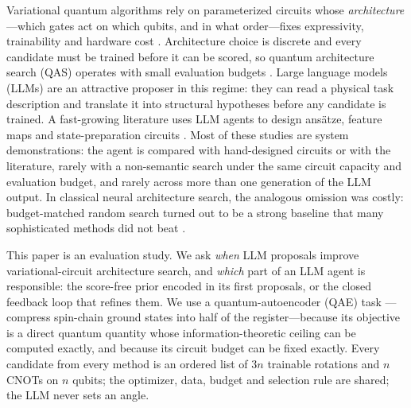 \documentclass[11pt]{article}
\begin{document}
Variational quantum algorithms rely on parameterized circuits whose
\emph{architecture}---which gates act on which qubits, and in what
order---fixes expressivity, trainability and hardware cost
\cite{bharti2022nisq,sim2019,mcclean2018barren}.
Architecture choice is discrete and every candidate must be trained before it
can be scored, so quantum architecture search (QAS) operates with small
evaluation budgets \cite{du2022,zhang2022dqas,kuo2021qasrl,ostaszewski2021structure,grimsley2019adapt}.
Large language models (LLMs) are an attractive proposer in this regime: they can
read a physical task description and translate it into structural hypotheses
before any candidate is trained.
A fast-growing literature uses LLM agents to design ans\"atze, feature maps and
state-preparation circuits
\cite{liang2023qgas,knipfer2026,sakka2025featuremap,sakka2026,cao2025funsearch,finger2026hive,gujju2025qcbm,ueda2025qgan,macarone2026testtime,bhatia2026qrc}.
Most of these studies are system demonstrations: the agent is compared with
hand-designed circuits or with the literature, rarely with a non-semantic search
under the same circuit capacity and evaluation budget, and rarely across more than
one generation of the LLM output.
In classical neural architecture search, the analogous omission was costly:
budget-matched random search turned out to be a strong baseline that many
sophisticated methods did not beat \cite{li2019randomnas,bergstra2012random}.

This paper is an evaluation study.
We ask \emph{when} LLM proposals improve variational-circuit architecture search,
and \emph{which} part of an LLM agent is responsible: the score-free prior encoded
in its first proposals, or the closed feedback loop that refines them.
We use a quantum-autoencoder (QAE) task \cite{romero2017}---compress spin-chain
ground states into half of the register---because its objective is a direct quantum
quantity whose information-theoretic ceiling can be computed exactly, and because
its circuit budget can be fixed exactly.
Every candidate from every method is an ordered list of $3n$ trainable rotations
and $n$ CNOTs on $n$ qubits; the optimizer, data, budget and selection rule are
shared; the LLM never sets an angle.
\end{document}
